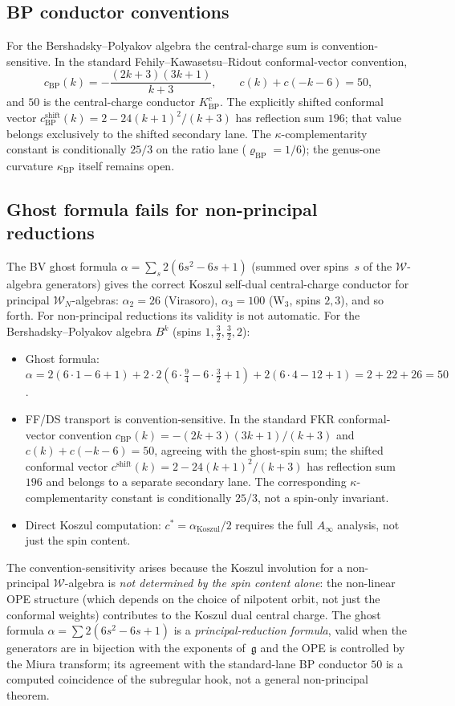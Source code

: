 \documentclass[11pt]{article}
\newcommand{\cW}{\mathcal{W}}
\newcommand{\fg}{\mathfrak{g}}
\begin{document}
\subsection{BP conductor conventions}
\label{subsec:bp-c-sum}

For the Bershadsky--Polyakov algebra the central-charge sum is
convention-sensitive.  In the standard Fehily--Kawasetsu--Ridout
conformal-vector convention,
\[
c_{\mathrm{BP}}(k)=-\frac{(2k+3)(3k+1)}{k+3},
\qquad c(k)+c(-k-6)=50,
\]
and $50$ is the central-charge conductor $K^c_{\mathrm{BP}}$.  The
explicitly shifted conformal vector
$c_{\mathrm{BP}}^{\mathrm{shift}}(k)=2-24(k+1)^2/(k+3)$ has
reflection sum $196$; that value belongs exclusively to the shifted
secondary lane.  The $\kappa$-complementarity constant is
conditionally $25/3$ on the ratio lane
($\varrho_{\mathrm{BP}}=1/6$); the genus-one curvature
$\kappa_{\mathrm{BP}}$ itself remains open.

\subsection{Ghost formula fails for non-principal reductions}
\label{subsec:ghost-formula-non-principal}

The BV ghost formula
$\alpha = \sum_s 2(6s^2 - 6s + 1)$
(summed over spins~$s$ of the $\cW$-algebra generators) gives
the correct Koszul self-dual central-charge conductor for
principal $\cW_N$-algebras: $\alpha_2 = 26$ (Virasoro),
$\alpha_3 = 100$ (W$_3$, spins $2,3$), and so forth.  For
non-principal reductions its validity is not automatic.  For the
Bershadsky--Polyakov algebra $B^k$
(spins $1, \tfrac{3}{2}, \tfrac{3}{2}, 2$):
\begin{itemize}[nosep]
\item Ghost formula:
  $\alpha = 2(6 \cdot 1 - 6 + 1) + 2 \cdot 2(6 \cdot \tfrac{9}{4}
  - 6 \cdot \tfrac{3}{2} + 1) + 2(6 \cdot 4 - 12 + 1)
  = 2 + 22 + 26 = 50$.
\item FF/DS transport is convention-sensitive.  In the standard
  FKR conformal-vector convention
  $c_{\mathrm{BP}}(k)=-(2k+3)(3k+1)/(k+3)$ and
  $c(k)+c(-k-6)=50$, agreeing with the ghost-spin sum; the shifted
  conformal vector $c^{\mathrm{shift}}(k)=2-24(k+1)^2/(k+3)$ has
  reflection sum $196$ and belongs to a separate secondary lane.
  The corresponding $\kappa$-complementarity constant is
  conditionally $25/3$, not a spin-only invariant.
\item Direct Koszul computation: $c^* = \alpha_{\mathrm{Koszul}}
  / 2$ requires the full $A_\infty$ analysis, not just the spin
  content.
\end{itemize}
The convention-sensitivity arises because the Koszul involution
for a non-principal $\cW$-algebra is \emph{not determined by the
spin content alone}: the non-linear OPE structure (which depends on
the choice of nilpotent orbit, not just the conformal weights)
contributes to the Koszul dual central charge.  The ghost formula
$\alpha = \sum 2(6s^2 - 6s + 1)$ is a \emph{principal-reduction
formula}, valid when the generators are in bijection
with the exponents of~$\fg$ and the OPE is controlled by the
Miura transform; its agreement with the standard-lane BP conductor
$50$ is a computed coincidence of the subregular hook, not a
general non-principal theorem.
\end{document}
